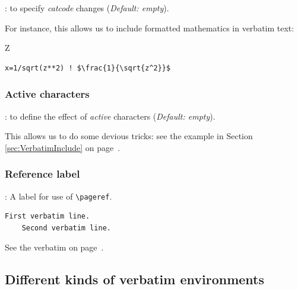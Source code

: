 \documentclass[twoside]{article}
\providecommand\optname[1]{\textsf{#1}}
\newenvironment{optlist}{\begin{description}%
  \renewcommand\makelabel[1]{%
    \descriptionlabel{\mdseries\optname{##1}}}%
  \itemsep0.25\itemsep}%
 {\end{description}}
\begin{document}
\begin{optlist}
  \item[codes (macro)]: to specify \emph{catcode} changes (\emph{Default:
  empty}).
\end{optlist}

  For instance, this allows us to include formatted mathematics in verbatim
text:

{
\begin{SideBySideExample}
  Z
  \begin{Verbatim}[commandchars=\\\{\},
         codes={\catcode`$=3\catcode`^=7}]
    x=1/sqrt(z**2) ! $\frac{1}{\sqrt{z^2}}$
  \end{Verbatim}
\end{SideBySideExample}
}  %


\subsubsection{Active characters}

\begin{optlist}
  \item[defineactive (macro)]: to define the effect of \emph{active}
  characters
  (\emph{Default: empty}).
\end{optlist}

  This allows us to do some devious tricks: see the example in Section
\ref{sec:VerbatimInclude} on page~\pageref{sec:VerbatimInclude}.


\subsubsection{Reference label}

\begin{optlist}
  \item[reflabel (<label>)]: A  label for use of \verb|\pageref|.
\end{optlist}

\begin{SideBySideExample}
  \begin{Verbatim}[reflabel=verb0]
    First verbatim line.
    Second verbatim line.
  \end{Verbatim}
  See the verbatim on 
  page~\pageref{verb0}.
\end{SideBySideExample}




\subsection{Different kinds of verbatim environments}
\end{document}
